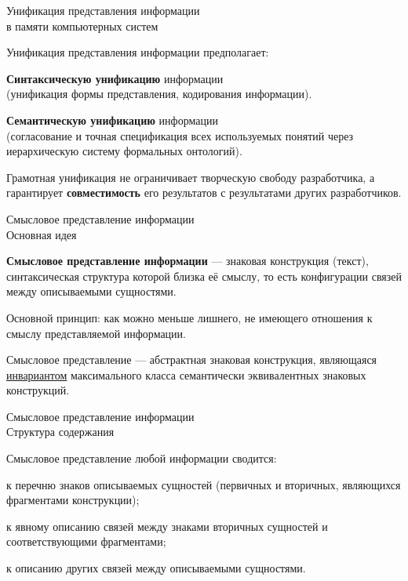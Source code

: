 \begin{frame}{Унификация представления информации\\в памяти компьютерных систем}
	\topline
	\justifying
	
	Унификация представления информации предполагает:
	\begin{textitemize}
		\item \textbf{Синтаксическую унификацию} информации\\
		(унификация формы представления, кодирования информации).
		\item \textbf{Семантическую унификацию} информации\\
		(согласование и точная спецификация всех используемых понятий через иерархическую систему формальных онтологий).
	\end{textitemize}
	
	\medskip
	Грамотная унификация не ограничивает творческую свободу разработчика, а гарантирует \textbf{совместимость} его результатов с результатами других разработчиков.
	
\end{frame}


\begin{frame}{Смысловое представление информации\\Основная идея}
	\topline
	\justifying
	
	\textbf{Смысловое представление информации} ---
	знаковая конструкция (текст), синтаксическая структура которой близка её смыслу, то есть конфигурации связей между описываемыми сущностями.
	
	\medskip
	Основной принцип: как можно меньше лишнего, не имеющего отношения к смыслу представляемой информации.
	
	\medskip
	Смысловое представление --- абстрактная знаковая конструкция, являющаяся \uline{инвариантом} максимального класса семантически эквивалентных знаковых конструкций.
	
\end{frame}


\begin{frame}{Смысловое представление информации\\Структура содержания}
	\topline
	\justifying
	
	Смысловое представление любой информации сводится:
	\begin{textitemize}
		\item к перечню знаков описываемых сущностей (первичных и вторичных, являющихся фрагментами конструкции);
		\item к явному описанию связей между знаками вторичных сущностей и соответствующими фрагментами;
		\item к описанию других связей между описываемыми сущностями.
	\end{textitemize}
	
\end{frame}


